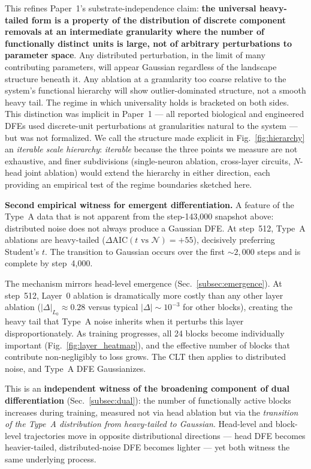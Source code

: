 \documentclass{article}
\begin{document}
This refines Paper~1's substrate-independence claim: \textbf{the universal heavy-tailed form is a property of the distribution of discrete component removals at an intermediate granularity where the number of functionally distinct units is large, not of arbitrary perturbations to parameter space}. Any distributed perturbation, in the limit of many contributing parameters, will appear Gaussian regardless of the landscape structure beneath it. Any ablation at a granularity too coarse relative to the system's functional hierarchy will show outlier-dominated structure, not a smooth heavy tail. The regime in which universality holds is bracketed on both sides. This distinction was implicit in Paper~1 --- all reported biological and engineered DFEs used discrete-unit perturbations at granularities natural to the system --- but was not formalized. We call the structure made explicit in Fig.~\ref{fig:hierarchy} an \emph{iterable scale hierarchy}: \emph{iterable} because the three points we measure are not exhaustive, and finer subdivisions (single-neuron ablation, cross-layer circuits, $N$-head joint ablation) would extend the hierarchy in either direction, each providing an empirical test of the regime boundaries sketched here.

\textbf{Second empirical witness for emergent differentiation.} A feature of the Type~A data that is not apparent from the step-143,000 snapshot above: distributed noise does not always produce a Gaussian DFE. At step~512, Type~A ablations are heavy-tailed ($\Delta\text{AIC}(t \text{ vs } \mathcal{N}) = +55$), decisively preferring Student's $t$. The transition to Gaussian occurs over the first $\sim\!2,\!000$ steps and is complete by step~4,000.

The mechanism mirrors head-level emergence (Sec.~\ref{subsec:emergence}). At step~512, Layer~0 ablation is dramatically more costly than any other layer ablation ($|\Delta|_{L_0} \approx 0.28$ versus typical $|\Delta| \sim 10^{-3}$ for other blocks), creating the heavy tail that Type~A noise inherits when it perturbs this layer disproportionately. As training progresses, all 24 blocks become individually important (Fig.~\ref{fig:layer_heatmap}), and the effective number of blocks that contribute non-negligibly to loss grows. The CLT then applies to distributed noise, and Type~A DFE Gaussianizes.

This is an \textbf{independent witness of the broadening component of dual differentiation} (Sec.~\ref{subsec:dual}): the number of functionally active blocks increases during training, measured not via head ablation but via the \emph{transition of the Type~A distribution from heavy-tailed to Gaussian}. Head-level and block-level trajectories move in opposite distributional directions --- head DFE becomes heavier-tailed, distributed-noise DFE becomes lighter --- yet both witness the same underlying process.
\end{document}
